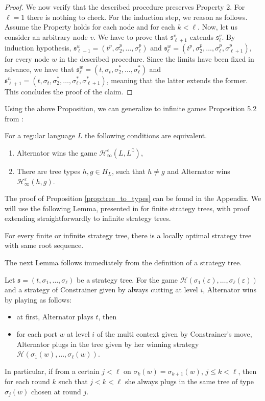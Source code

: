 \begin{proof}
We now verify that the described procedure preserves Property 2. For $\ell=1$ there is nothing to check. For the induction step, we reason as follows. Assume the Property holds for each node and for each $k<\ell$. Now, let us consider an arbitrary node $v$. We have to prove that $\mathfrak{s}^v_{\ell+1}$ extends $\mathfrak{s}^v_{\ell}$. 
By induction hypothesis,  $\mathfrak{s}^w_{\ell-1}=(t^p, \sigma^p_{2}, \dots, \sigma^p_{\ell})$ and
$\mathfrak{s}^w_{\ell}=(t^p, \sigma^p_{2}, \dots, \sigma^p_{\ell}, \sigma^p_{\ell+1})$, for every node $w$  in the described procedure. Since the limits have been fixed in advance, we have that $\mathfrak{s}^w_{\ell}=(t, \sigma_t, \sigma^*_2, \dots, \sigma^*_\ell)$ and $\mathfrak{s}^n_{\ell+1}=(t, \sigma_t, \sigma^*_2, \dots, \sigma^*_\ell, \sigma^*_{\ell+1})$, meaning that the latter extends the former. This concludes the proof of the claim.
 \end{proof}
 
Using the above Proposition, we can generalize to infinite games Proposition 5.2 from \cite{bp}:
\begin{proposition}\label{prop:tree_to_types}
For a regular language $L$ 
the following conditions are equivalent.
 \begin{enumerate}
\item Alternator wins the game $\mathcal{H}^\varepsilon_\infty(L, L^\complement)$, 
 \item  There are tree types $h, g\in H_L$, such that $h\neq g$ and Alternator wins $\mathcal{H}^\varepsilon_\infty(h, g)$.
 \end{enumerate}
\end{proposition}
The proof of Proposition \ref{prop:tree_to_types} can be found in the Appendix.
We will use the following Lemma, presented in \cite{bp} for finite strategy trees, with proof extending straightforwardly to infinite strategy trees.
\begin{lemma}\label{lemma:locallyoptimal}
For every finite or infinite strategy tree, there is a locally optimal strategy tree with same root sequence.
\end{lemma}
The next Lemma  follows immediately from the definition of a strategy tree.
\begin{lemma}\label{lemma:short_strategy}
Let $\mathfrak{s}=(t, \sigma_1, \dots, \sigma_\ell)$ be a strategy tree. For the game $\mathcal{H}(\sigma_1(\varepsilon), \dots, \sigma_\ell(\varepsilon))$ and a strategy of Constrainer given by always cutting at level $i$, Alternator wins  by playing as follows:
\begin{itemize}
\item at first, Alternator plays $t$, then
\item for each port $w$ at level $i$ of the multi context given by Constrainer's move, Alternator plugs in the tree given by her winning strategy $\mathcal{H}(\sigma_1(w), \dots, \sigma_\ell(w))$.
\end{itemize}
In particular, if from a certain $j<\ell$ on $\sigma_k(w)=\sigma_{k+1}(w)$, $j\leq k < \ell$, then for each round $k$ such that $j< k < \ell$ she always plugs in the same tree of type $\sigma_j(w)$ chosen at round $j$.
\end{lemma}
